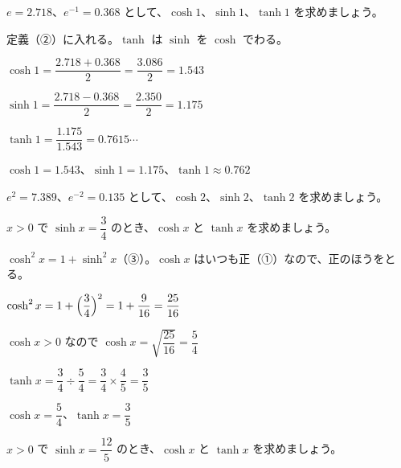 \begin{reidai}
$e=2.718$、$e^{-1}=0.368$ として、$\cosh1$、$\sinh1$、$\tanh1$ を求めましょう。\par
\kangaekata 定義（②）に入れる。$\tanh$ は $\sinh$ を $\cosh$ でわる。\par
\shiki{}\zw{} $\cosh1=\dfrac{2.718+0.368}{2}=\dfrac{3.086}{2}=1.543$\par
\bkvila $\sinh1=\dfrac{2.718-0.368}{2}=\dfrac{2.350}{2}=1.175$\par
\bkvila $\tanh1=\dfrac{1.175}{1.543}=0.7615\cdots$\par
\kotae{}\zw{} $\cosh1=1.543$、$\sinh1=1.175$、$\tanh1\approx0.762$
\end{reidai}

\begin{jibun}
$e^2=7.389$、$e^{-2}=0.135$ として、$\cosh2$、$\sinh2$、$\tanh2$ を求めましょう。
\end{jibun}

\begin{reidai}[$\cosh^2x-\sinh^2x=1$ を使う]
$x>0$ で $\sinh x=\dfrac{3}{4}$ のとき、$\cosh x$ と $\tanh x$ を求めましょう。\par
\kangaekata $\cosh^2x=1+\sinh^2x$（③）。$\cosh x$ はいつも正（①）なので、正のほうをとる。\par
\shiki{}\zw{} $\cosh^2x=1+\Bigl(\dfrac{3}{4}\Bigr)^2=1+\dfrac{9}{16}=\dfrac{25}{16}$\par
\bkvila $\cosh x>0$ なので $\cosh x=\sqrt{\dfrac{25}{16}}=\dfrac{5}{4}$\par
\bkvila $\tanh x=\dfrac{3}{4}\div\dfrac{5}{4}=\dfrac{3}{4}\times\dfrac{4}{5}=\dfrac{3}{5}$\par
\kotae{}\zw{} $\cosh x=\dfrac{5}{4}$、$\tanh x=\dfrac{3}{5}$
\end{reidai}

\begin{jibun}
$x>0$ で $\sinh x=\dfrac{12}{5}$ のとき、$\cosh x$ と $\tanh x$ を求めましょう。
\end{jibun}

